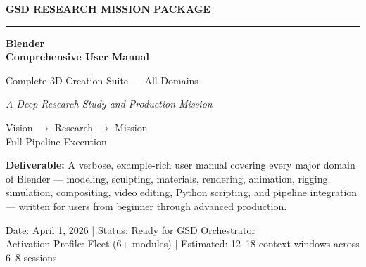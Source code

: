\documentclass[11pt,letterpaper]{article}
\begin{document}

\thispagestyle{empty}
\begin{center}
\vspace*{2.5cm}

{\small\sffamily\textcolor{primary}{\textbf{GSD RESEARCH MISSION PACKAGE}}}

\vspace{0.3cm}
\textcolor{bordergray}{\rule{9cm}{0.4pt}}

\vspace{1.5cm}
{\fontsize{28}{34}\selectfont\bfseries\sffamily\textcolor{primary}{Blender\\[0.3em]Comprehensive User Manual}}

\vspace{0.8cm}
{\Large\sffamily\textcolor{secondary}{Complete 3D Creation Suite --- All Domains}}

\vspace{0.5cm}
{\large\sffamily\itshape\textcolor{tertiary}{A Deep Research Study and Production Mission}}

\vspace{2.5cm}
{\sffamily\textcolor{accent}{Vision $\rightarrow$ Research $\rightarrow$ Mission}}\\[0.3em]
{\small\sffamily\textcolor{accent}{Full Pipeline Execution}}

\vspace{0.8cm}
\begin{tcolorbox}[colback=lightsecondary, colframe=secondary, arc=3pt, boxrule=0.5pt,
  left=16pt, right=16pt, top=10pt, bottom=10pt, width=0.82\textwidth]
{\sffamily\textcolor{secondary}{\textbf{Deliverable:}} A verbose, example-rich user manual covering every major domain of
Blender --- modeling, sculpting, materials, rendering, animation, rigging,
simulation, compositing, video editing, Python scripting, and pipeline
integration --- written for users from beginner through advanced production.}
\end{tcolorbox}

\vspace{2.5cm}
{\small\sffamily\textcolor{subtlegray}{Date: April 1, 2026  |  Status: Ready for GSD Orchestrator}}\\[0.3em]
{\small\sffamily\textcolor{subtlegray}{Activation Profile: Fleet (6+ modules)  |  Estimated: 12--18 context windows across 6--8 sessions}}
\end{center}
\newpage
\end{document}
